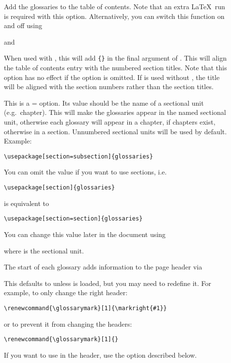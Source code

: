 \documentclass[report]{nlctdoc}
\begin{document}
\begin{description}
\item[] Add the glossaries to the table of contents.
Note that an extra \LaTeX\ run is required with this option.
Alternatively, you can switch this function on and off using
\begin{definition}[\DescribeMacro{\glstoctrue}]
\end{definition}
and
\begin{definition}[\DescribeMacro{\glstocfalse}]
\end{definition}

\item[] When used with , this will
add \verb|{}| in the final argument of 
. This will align the table of contents entry 
with the numbered section titles. Note that this option has no
effect if the  option is omitted. If  is
used without , the title will be aligned with
the section numbers rather than the section titles.

\item[] This is a = option.  Its
value should be the name of a sectional unit (e.g.\ chapter).
This will make the glossaries appear in the named sectional unit,
otherwise each glossary will appear in a chapter, if chapters
exist, otherwise in a section. Unnumbered sectional units will be used
by default. Example:
\begin{verbatim}
\usepackage[section=subsection]{glossaries}
\end{verbatim}
You can omit the value if you want to use sections, i.e.\
\begin{verbatim}
\usepackage[section]{glossaries}
\end{verbatim}
is equivalent to
\begin{verbatim}
\usepackage[section=section]{glossaries}
\end{verbatim}
You can change this value later in the document using
\begin{definition}[\DescribeMacro{\setglossarysection}]
\end{definition}
where  is the sectional unit.

The start of each glossary adds information to the page header via
\begin{definition}[\DescribeMacro{\glossarymark}]
\end{definition}
This defaults to  unless  is loaded, but you may 
need to redefine it.
For example, to only change the right header:
\begin{verbatim}
\renewcommand{\glossarymark}[1]{\markright{#1}}
\end{verbatim}
or to prevent it from changing the headers:
\begin{verbatim}
\renewcommand{\glossarymark}[1]{}
\end{verbatim}
If you want  to use  in the header, use the
\pkgopt{ucmark} option described below.


\end{description}
\end{document}
